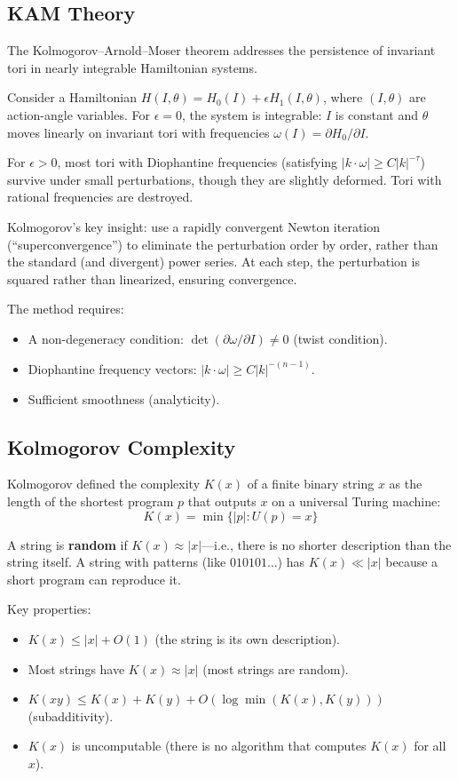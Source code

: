 \subsection{KAM Theory}

The Kolmogorov--Arnold--Moser theorem addresses the persistence of invariant tori in nearly integrable Hamiltonian systems.

Consider a Hamiltonian $H(I, \theta) = H_0(I) + \epsilon H_1(I, \theta)$, where $(I, \theta)$ are action-angle variables. For $\epsilon = 0$, the system is integrable: $I$ is constant and $\theta$ moves linearly on invariant tori with frequencies $\omega(I) = \partial H_0/\partial I$.

For $\epsilon > 0$, most tori with Diophantine frequencies (satisfying $|k \cdot \omega| \geq C|k|^{-\tau}$) survive under small perturbations, though they are slightly deformed. Tori with rational frequencies are destroyed.

Kolmogorov's key insight: use a rapidly convergent Newton iteration (``superconvergence'') to eliminate the perturbation order by order, rather than the standard (and divergent) power series. At each step, the perturbation is squared rather than linearized, ensuring convergence.

The method requires:
\begin{itemize}
    \item A non-degeneracy condition: $\det(\partial \omega / \partial I) \neq 0$ (twist condition).
    \item Diophantine frequency vectors: $|k \cdot \omega| \geq C|k|^{-(n-1)}$.
    \item Sufficient smoothness (analyticity).
\end{itemize}

\subsection{Kolmogorov Complexity}

Kolmogorov defined the complexity $K(x)$ of a finite binary string $x$ as the length of the shortest program $p$ that outputs $x$ on a universal Turing machine:
\[
K(x) = \min\{|p| : U(p) = x\}
\]

A string is \textbf{random} if $K(x) \approx |x|$---i.e., there is no shorter description than the string itself. A string with patterns (like $010101\dots$) has $K(x) \ll |x|$ because a short program can reproduce it.

Key properties:
\begin{itemize}
    \item $K(x) \leq |x| + O(1)$ (the string is its own description).
    \item Most strings have $K(x) \approx |x|$ (most strings are random).
    \item $K(xy) \leq K(x) + K(y) + O(\log \min(K(x), K(y)))$ (subadditivity).
    \item $K(x)$ is uncomputable (there is no algorithm that computes $K(x)$ for all $x$).
\end{itemize}

